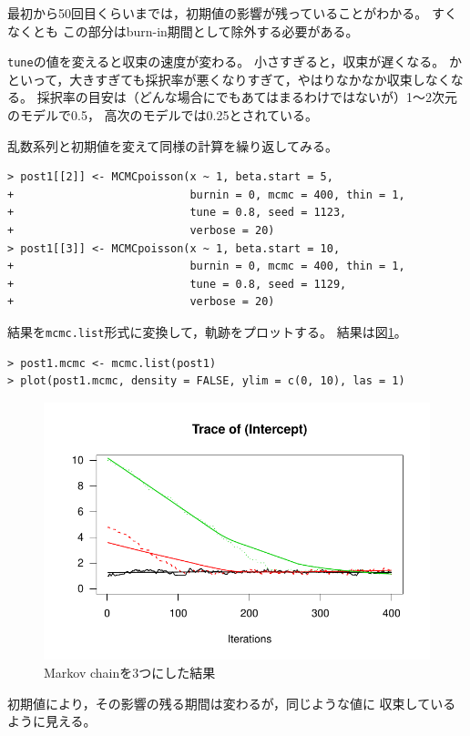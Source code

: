 \documentclass[11pt,uplatex]{jsarticle}
\begin{document}
最初から50回目くらいまでは，初期値の影響が残っていることがわかる。
すくなくとも この部分はburn-in期間として除外する必要がある。

\texttt{tune}の値を変えると収束の速度が変わる。
小さすぎると，収束が遅くなる。
かといって，大きすぎても採択率が悪くなりすぎて，やはりなかなか収束しなくなる。
採択率の目安は（どんな場合にでもあてはまるわけではないが）1〜2次元のモデルで0.5，
高次のモデルでは0.25とされている\cite{IMCMR}。

\vspace{4zw}


乱数系列と初期値を変えて同様の計算を繰り返してみる。

\begin{lstlisting}
> post1[[2]] <- MCMCpoisson(x ~ 1, beta.start = 5,
+                           burnin = 0, mcmc = 400, thin = 1,
+                           tune = 0.8, seed = 1123,
+                           verbose = 20)
> post1[[3]] <- MCMCpoisson(x ~ 1, beta.start = 10,
+                           burnin = 0, mcmc = 400, thin = 1,
+                           tune = 0.8, seed = 1129,
+                           verbose = 20)
\end{lstlisting}
%
結果を\texttt{mcmc.list}形式に変換して，軌跡をプロットする。
結果は図\ref{MCMC3}。

\begin{lstlisting}
> post1.mcmc <- mcmc.list(post1)
> plot(post1.mcmc, density = FALSE, ylim = c(0, 10), las = 1)
\end{lstlisting}
%

\begin{figure}[hbtp]
  \begin{center}
    \includegraphics[bb=0 0 360 240, clip, width=260 bp]{example1-2.pdf}
  \end{center}
  \caption{Markov chainを3つにした結果}
  \label{MCMC3}
\end{figure}\noindent
初期値により，その影響の残る期間は変わるが，同じような値に
収束しているように見える。
\end{document}
